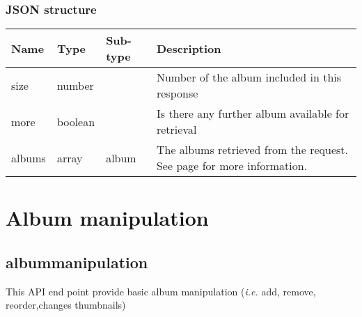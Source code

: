 \documentclass[a4paper,12pt]{report}
\newcommand{\see}[1]{See page \pageref{#1} for more information.}
\begin{document}
	\subsection{JSON structure}
	\begin{tabular}{|l|l|l|p{10cm}|}
		\hline
		Name & Type & Sub-type & Description\\\hline
		size & number & & Number of the album included in this response\\\hline
		more & boolean & & Is there any further album available for retrieval\\\hline
		albums & array & album & The albums retrieved from the request. \see{obj:album}\\\hline
	\end{tabular}
	
	\chapter{Album manipulation}
	
	\section{albummanipulation}
	This API end point provide basic album manipulation (\textit{i.e.} add, remove, reorder,changes thumbnails)
\end{document}
